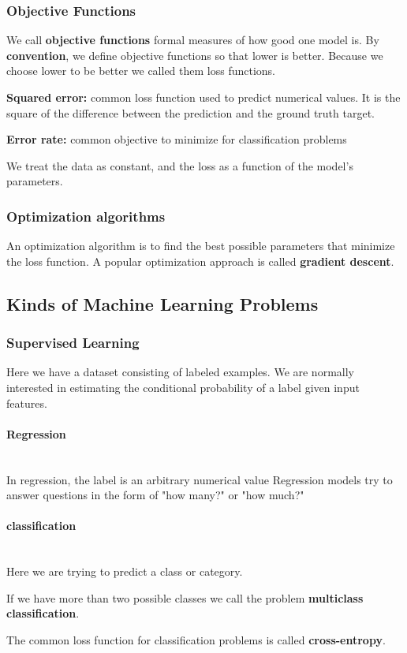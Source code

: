 \documentclass[]{article}
\newcommand{\eparagraph}[1]{\paragraph{#1}~\\}
\begin{document}
\subsubsection{Objective Functions}
We call \textbf{objective functions} formal measures of how good one model is.
By \textbf{convention}, we define objective functions so that lower is better.
Because we choose lower to be better we called them loss functions.

\textbf{Squared error:} common loss function used to predict numerical values. It
is the square of the difference between the prediction and the ground truth target.

\textbf{Error rate:} common objective to minimize for classification problems

We treat the data as constant, and the loss as a function of the model's parameters.

\subsubsection{Optimization algorithms}
An optimization algorithm is to find the best possible parameters that minimize the loss function.
A popular optimization approach is called \textbf{gradient descent}.

\subsection{Kinds of Machine Learning Problems}

\subsubsection{Supervised Learning}
Here we have a dataset consisting of labeled examples. We are normally interested
in estimating the conditional probability of a label given input features.

\eparagraph{Regression}

In regression, the label is an arbitrary numerical value
Regression models try to answer questions in the form of "how many?" or "how much?"

\eparagraph{classification}
Here we are trying to predict a class or category.

If we have more than two possible classes we call the problem \textbf{multiclass classification}.

The common loss function for classification problems is called \textbf{cross-entropy}.
\end{document}
